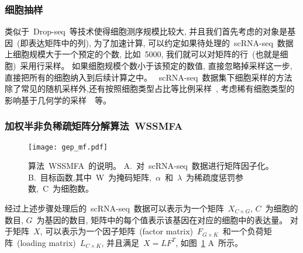 \subsubsection{细胞抽样}
类似于~Drop-seq~等技术使得细胞测序规模比较大, 并且我们首先考虑的对象是基因~(即表达矩阵中的列), 
为了加速计算, 可以约定如果待处理的~scRNA-seq~数据上细胞规模大于一个预定的个数, 比如~5000,
我们就可以对矩阵的行~(也就是细胞)~采用行采样。
如果细胞规模个数小于该预定的数值, 直接忽略掉采样这一步, 
直接把所有的细胞纳入到后续计算之中。
~scRNA-seq~数据集下细胞采样的方法除了常见的随机采样外,还有按照细胞类型占比等比例采样~\cite{sinha2018dropclust},
考虑稀有细胞类型的影响基于几何学的采样~\cite{hie2019geometric}~等。

\subsubsection{加权半非负稀疏矩阵分解算法~WSSMFA}

\begin{figure}[!htbp]
    \centering
    \texttt{[image: gep\_mf.pdf]}
    \caption{
        算法~WSSMFA~的说明。
        A.~对~scRNA-seq~数据进行矩阵因子化。
        B.~目标函数,其中~W~为掩码矩阵,~$\alpha$~和~$\lambda$~为稀疏度惩罚参数,~C~为细胞数。
    }
    \label{fig:gep-mf}
\end{figure}

经过上述步骤处理后的~scRNA-seq~数据可以表示为一个矩阵~$X_{C \times G}$, $C$~为细胞的数目, $G$~为基因的数目, 
矩阵中的每个值表示该基因在对应的细胞中的表达量。
对于矩阵~$X$, 可以表示为一个因子矩阵~(factor matrix)~$F_{G \times K}$~和一个负荷矩阵~(loading matrix)~$L_{C \times K}$,
并且满足~$X=LF^T$, 如图~\ref{fig:gep-mf} A~所示。 

